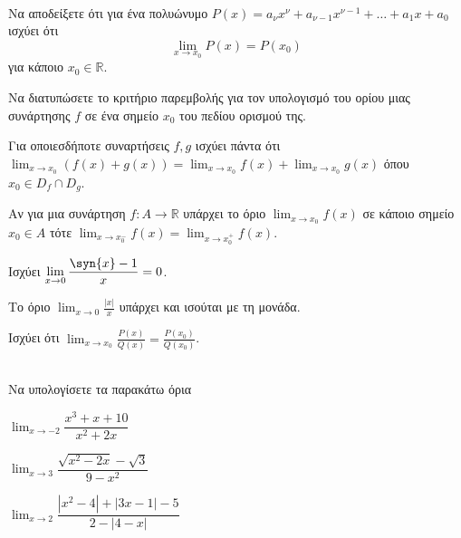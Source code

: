 \documentclass[twoside,nofonts,ektypwsh,math,spyros]{frontisthrio-diag}
\begin{document}
\begin{thema}
\item\mbox{}\\
\vspace{-5mm}
\begin{erwthma}
\item Να αποδείξετε ότι για ένα πολυώνυμο $ P(x)=a_\nu x^\nu+a_{\nu-1}x^{\nu-1}+\ldots+a_1 x+a_0 $ ισχύει ότι
\[ \lim_{x\to x_0}{P(x)}=P(x_0) \]
για κάποιο $ x_0\in\mathbb{R} $.
\item Να διατυπώσετε το κριτήριο παρεμβολής για τον υπολογισμό του ορίου μιας συνάρτησης $ f $ σε ένα σημείο $ x_0 $ του πεδίου ορισμού της.
\item \swstolathospan
\begin{alist}
\item Για οποιεσδήποτε συναρτήσεις $ f,g $ ισχύει πάντα ότι $ {\displaystyle\lim_{x\to x_0}{(f(x)+g(x))}=\lim_{x\to x_0}{f(x)}+\lim_{x\to x_0}{g(x)}} $ όπου $ x_0\in D_f\cap D_g $.
\item Αν για μια συνάρτηση $ f:A\to\mathbb{R} $ υπάρχει το όριο $ {\displaystyle\lim_{x\to x_0}{f(x)}} $ σε κάποιο σημείο $ x_0\in A $ τότε $ {\displaystyle\lim_{x\to x_0^-}{f(x)}=\displaystyle\lim_{x\to x_0^+}{f(x)}} $.
\item Ισχύει $ {\displaystyle\lim_{x\to0}{\frac{\syn{x}-1}{x}}=0} $.
\item Το όριο $ {\displaystyle\lim_{x\to 0}{\frac{|x|}{x}}} $ υπάρχει και ισούται με τη μονάδα.
\item Ισχύει ότι $ {\displaystyle\lim_{x\to x_0}{\frac{P(x)}{Q(x)}}=\frac{P(x_0)}{Q(x_0)}} $.
\end{alist}
\end{erwthma}
\item \mbox{}\\
Να υπολογίσετε τα παρακάτω όρια
\begin{multicols}{3}
\begin{erwthma}
\item $ {\displaystyle\lim_{x\to -2}\dfrac{x^3+x+10}{x^2+2x}} $
\item $ {\displaystyle\lim_{x\to 3}\dfrac{\sqrt{x^2-2x}-\sqrt{3}}{9-x^2}} $
\item $ {\displaystyle\lim_{x\to 2}\dfrac{|x^2-4|+|3x-1|-5}{2-|4-x|}} $
\end{erwthma}
\end{multicols}
\item\mbox{}\\

\end{thema}
\end{document}
